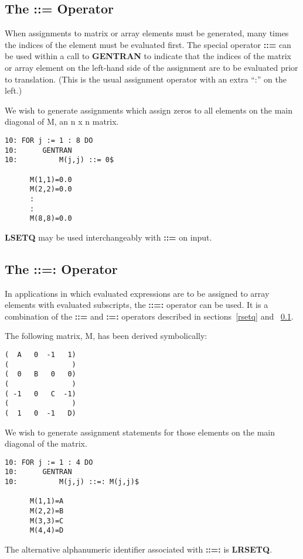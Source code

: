 \subsection{The ::= Operator}
\label{lsetq}
When assignments to matrix or array elements must be generated, many
times the indices of the element must be evaluated first.  The special
operator\index{::=}
{\bf ::=} can be used within a call to {\bf GENTRAN}
to indicate that the indices of the matrix or
array element on the left-hand side of the assignment are to
be evaluated prior to translation.  (This is the usual \REDUCE{}
assignment operator with an extra ``:'' on the left.) 
\begin{describe}{\example}
We wish to generate assignments which assign zeros to all elements
on the main diagonal of M, an n x n matrix.
\begin{verbatim}
10: FOR j := 1 : 8 DO
10:      GENTRAN
10:          M(j,j) ::= 0$

      M(1,1)=0.0
      M(2,2)=0.0
      :
      :
      M(8,8)=0.0
\end{verbatim}
\end{describe}

{\bf LSETQ} may be used interchangeably with {\bf ::=} on input.

\subsection{The ::=: Operator}
\label{lrsetq}
\index{::=:} 
In applications in which evaluated expressions are to be assigned to
array elements with evaluated subscripts, the {\bf ::=:} operator can be
used.  It is a combination of the {\bf ::=} and {\bf :=:} operators described
in sections~\ref{rsetq} and ~\ref{lsetq}.

\begin{describe}{\example}
The following matrix, M, has been derived symbolically:
\newpage
\begin{verbatim}
(  A   0  -1   1)
(               )
(  0   B   0   0)
(               )
( -1   0   C  -1)
(               )
(  1   0  -1   D)
\end{verbatim}
We wish to generate assignment statements for those elements
on the main diagonal of the matrix.
\begin{verbatim}
10: FOR j := 1 : 4 DO
10:      GENTRAN
10:          M(j,j) ::=: M(j,j)$

      M(1,1)=A
      M(2,2)=B
      M(3,3)=C
      M(4,4)=D
\end{verbatim}
\end{describe}
The alternative alphanumeric identifier associated with {\bf ::=:} is
{\bf LRSETQ}.

